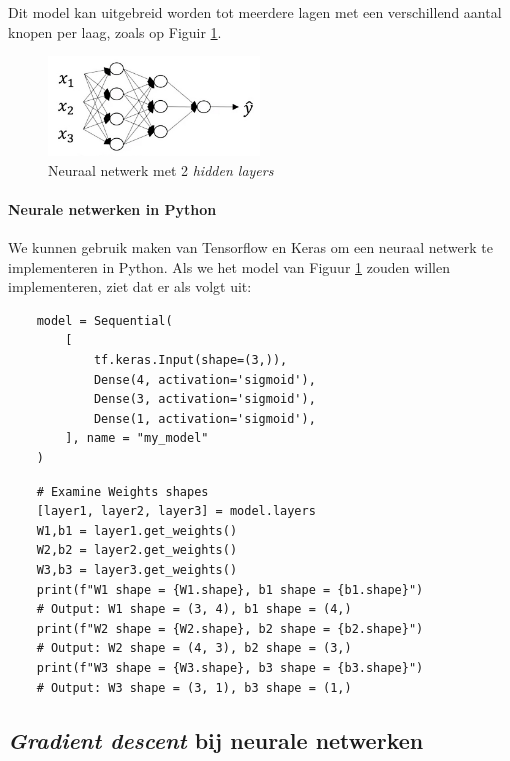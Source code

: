 \noindent
Dit model kan uitgebreid worden tot meerdere lagen met een verschillend aantal knopen per laag, zoals op Figuir \ref{fig:neural-network-model-2}.
\begin{figure}[h]
	\centering
	\includegraphics[width=0.5\textwidth]{images/15-neural-network-model-2.png}
	\caption{Neuraal netwerk met 2 \textit{hidden layers}}
	\label{fig:neural-network-model-2}
\end{figure}

\paragraph{Neurale netwerken in Python}

We kunnen gebruik maken van Tensorflow en Keras om een neuraal netwerk te implementeren in Python. Als we het model van Figuur \ref{fig:neural-network-model-2} zouden willen implementeren, ziet dat er als volgt uit:
\begin{lstlisting}
	model = Sequential(
	    [
	        tf.keras.Input(shape=(3,)), 
	        Dense(4, activation='sigmoid'),
	        Dense(3, activation='sigmoid'),
	        Dense(1, activation='sigmoid'),
	    ], name = "my_model"
	)
\end{lstlisting}
\begin{lstlisting}
	# Examine Weights shapes
	[layer1, layer2, layer3] = model.layers
	W1,b1 = layer1.get_weights()
	W2,b2 = layer2.get_weights()
	W3,b3 = layer3.get_weights()
	print(f"W1 shape = {W1.shape}, b1 shape = {b1.shape}") 
	# Output: W1 shape = (3, 4), b1 shape = (4,)
	print(f"W2 shape = {W2.shape}, b2 shape = {b2.shape}") 
	# Output: W2 shape = (4, 3), b2 shape = (3,)
	print(f"W3 shape = {W3.shape}, b3 shape = {b3.shape}") 
	# Output: W3 shape = (3, 1), b3 shape = (1,)
\end{lstlisting}

\subsection{\textit{Gradient descent} bij neurale netwerken}

